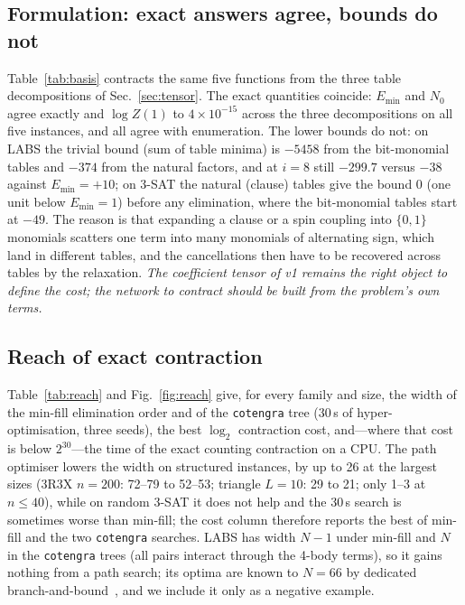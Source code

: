 \documentclass{article}
\newcommand{\Emin}{E_{\min}}
\newcommand{\N}{N_0}
\begin{document}
\subsection{Formulation: exact answers agree, bounds do not}
\label{sec:exp-basis}
Table~\ref{tab:basis} contracts the same five functions from the three table decompositions of Sec.~\ref{sec:tensor}. The exact quantities coincide: $\Emin$ and $\N$ agree exactly and $\log Z(1)$ to $4\times10^{-15}$ across the three decompositions on all five instances, and all agree with enumeration. The lower bounds do not: on LABS the trivial bound (sum of table minima) is $-5458$ from the bit-monomial tables and $-374$ from the natural factors, and at $i=8$ still $-299.7$ versus $-38$ against $\Emin=+10$; on 3-SAT the natural (clause) tables give the bound $0$ (one unit below $\Emin=1$) before any elimination, where the bit-monomial tables start at $-49$. The reason is that expanding a clause or a spin coupling into $\{0,1\}$ monomials scatters one term into many monomials of alternating sign, which land in different tables, and the cancellations then have to be recovered across tables by the relaxation. \emph{The coefficient tensor of v1 remains the right object to define the cost; the network to contract should be built from the problem's own terms.}

\begin{table}[t]
\centering\small
\caption{Lower bounds (dual ascent + mini-bucket at $i$-bound $4/8/12$, and the trivial sum of table minima) from three decompositions of the same cost. Exact contraction gives the same $\Emin$ for all three.}
\label{tab:basis}
\end{table}

\subsection{Reach of exact contraction}
\label{sec:exp-reach}
Table~\ref{tab:reach} and Fig.~\ref{fig:reach} give, for every family and size, the width of the min-fill elimination order and of the \texttt{cotengra} tree (30\,s of hyper-optimisation, three seeds), the best $\log_2$ contraction cost, and---where that cost is below $2^{30}$---the time of the exact counting contraction on a CPU. The path optimiser lowers the width on structured instances, by up to 26 at the largest sizes (3R3X $n{=}200$: 72--79 to 52--53; triangle $L{=}10$: 29 to 21; only 1--3 at $n\le40$), while on random 3-SAT it does not help and the 30\,s search is sometimes worse than min-fill; the cost column therefore reports the best of min-fill and the two \texttt{cotengra} searches. LABS has width $N-1$ under min-fill and $N$ in the \texttt{cotengra} trees (all pairs interact through the 4-body terms), so it gains nothing from a path search; its optima are known to $N=66$ by dedicated branch-and-bound~\cite{packebusch2016labs}, and we include it only as a negative example.
\end{document}

